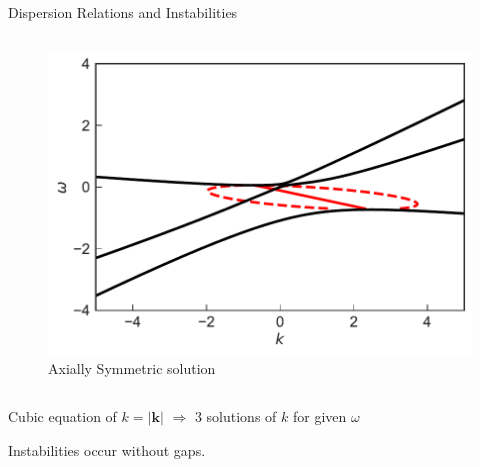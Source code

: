 \begin{frame}{Dispersion Relations and Instabilities}
\begin{columns}[T]
\begin{column}{0.5\textwidth}
   \begin{figure}
      \includegraphics[width=\linewidth]{assets/dr/spectDB3WC4DRDBMZAPltBlob.pdf}
      \caption*{ Axially Symmetric solution}
   \end{figure}
\end{column}

   \end{columns}



\pause
\begin{tcolorbox}[halign=center]
   Cubic equation of $k=\lvert \boldsymbol{k} \rvert$ $\Rightarrow$ 3 solutions of $k$ for given $\omega$
\end{tcolorbox}



\pause
   \begin{tcolorbox}
      \centering
         \color{black}Instabilities occur without gaps.
   \end{tcolorbox}



\end{frame}


